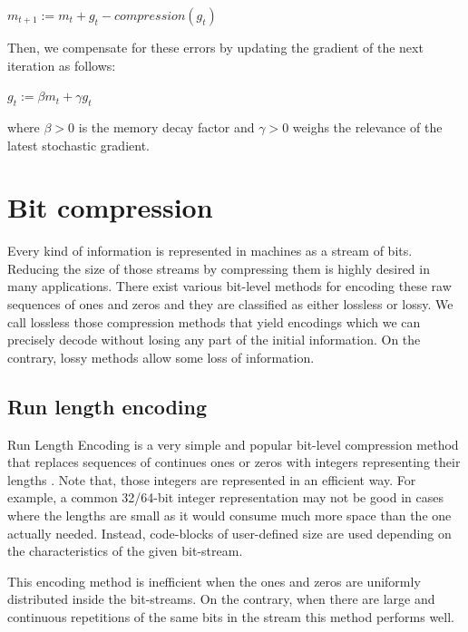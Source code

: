     \begin{flushleft}
    \centering
    \setlength{\parindent}{40ex} 
    $m_{t+1} := m_{t} + g_{t} - compression(g_{t})$
    \end{flushleft}
    
    Then, we compensate for these errors by updating the gradient of the next iteration as follows:
    \begin{flushleft}
    \centering
    \setlength{\parindent}{40ex} 
    $g_{t} := \beta m_{t} + \gamma g_{t}$
    \end{flushleft}
    where $\beta>0$ is the memory decay factor and $\gamma>0$ weighs the relevance of the latest stochastic gradient.
    
    
    \newpage
    
    \section{Bit compression}
    Every kind of information is represented in machines as a stream of bits.
    Reducing the size of those streams by compressing them is highly desired in many applications. 
    There exist various bit-level methods for encoding these raw sequences of ones and zeros and they are classified as either lossless or lossy.
    We call lossless those compression methods that yield encodings which we can precisely decode without losing any part of the initial information. On the contrary, lossy methods allow some loss of information.
    
    \subsection{Run length encoding}
    Run Length Encoding is a very simple and popular bit-level compression method that replaces sequences of continues ones or zeros with integers representing their lengths \cite{rle}. 
    Note that, those integers are represented in an efficient way.
    For example, a common 32/64-bit integer representation may not be good in cases where the lengths are small as it would consume much more space than the one actually needed.
    Instead, code-blocks of user-defined size are used depending on the characteristics of the given bit-stream.
    
    This encoding method is inefficient when the ones and zeros are uniformly distributed inside the bit-streams. On the contrary, when there are large and continuous repetitions of the same bits in the stream this method performs well. 
    
